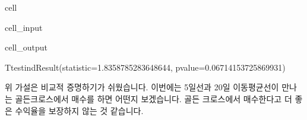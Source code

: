 \documentclass[letterpaper,10pt,english]{jupyterBook}
\begin{document}
\begin{sphinxuseclass}{cell}\begin{sphinxVerbatimInput}

\begin{sphinxuseclass}{cell_input}
\begin{sphinxVerbatim}[commandchars=\\\{\}]
   
  \PYG{p}{[}\PYG{p}{[}\PYG{p}{]}\PYG{p}{]}\PYG{p}{[}\PYG{p}{]}
  \PYG{p}{[}\PYG{p}{[}\PYG{p}{]}\PYG{p}{]}\PYG{p}{[}\PYG{p}{]}

  
\end{sphinxVerbatim}

\end{sphinxuseclass}\end{sphinxVerbatimInput}
\begin{sphinxVerbatimOutput}

\begin{sphinxuseclass}{cell_output}
\begin{sphinxVerbatim}[commandchars=\\\{\}]
Ttest\PYGZus{}indResult(statistic=\PYGZhy{}1.8358785283648644, pvalue=0.06714153725869931)
\end{sphinxVerbatim}

\end{sphinxuseclass}\end{sphinxVerbatimOutput}

\end{sphinxuseclass}
\sphinxAtStartPar
 위 가설은 비교적 증명하기가 쉬웠습니다. 이번에는 5일선과 20일 이동평균선이 만나는 골든크로스에서 매수를 하면 어떤지 보겠습니다. 골든 크로스에서 매수한다고 더 좋은 수익율을 보장하지 않는 것 같습니다.
\end{document}
